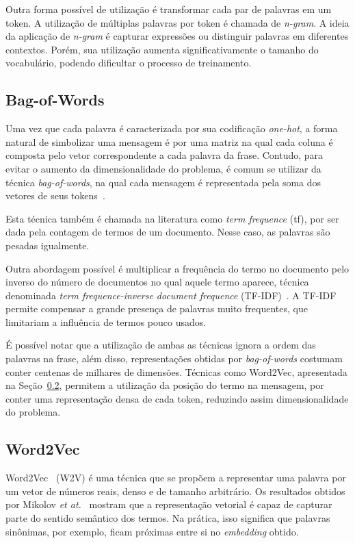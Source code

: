 Outra forma possível de utilização é transformar cada par de palavras em um token.
A utilização de múltiplas palavras por token é chamada de \textit{n-gram}.
A ideia da aplicação de \textit{n-gram} é capturar expressões ou distinguir palavras em diferentes contextos.
Porém, sua utilização aumenta significativamente o tamanho do vocabulário, podendo dificultar o processo de treinamento.

\subsection{Bag-of-Words}

Uma vez que cada palavra é caracterizada por sua codificação \textit{one-hot}, a forma natural de simbolizar uma
mensagem é por uma matriz na qual cada coluna é composta pelo vetor correspondente a cada palavra da frase.
Contudo, para evitar o aumento da dimensionalidade do problema, é comum se utilizar da técnica \textit{bag-of-words}, na
qual cada mensagem é representada pela soma dos vetores de seus tokens~\cite{schutze08}.

Esta técnica também é chamada na literatura como \textit{term frequence} (tf), por ser dada pela contagem de termos de
um documento.
Nesse caso, as palavras são pesadas igualmente.

Outra abordagem possível é multiplicar a frequência do termo no documento pelo inverso do número de documentos no qual
aquele termo aparece, técnica denominada \textit{term frequence-inverse document frequence} (TF-IDF)~\cite{salton88}.
A TF-IDF permite compensar a grande presença de palavras muito frequentes, que limitariam a influência de termos pouco
usados.

É possível notar que a utilização de ambas as técnicas ignora a ordem das palavras na frase, além disso, representações
obtidas por \textit{bag-of-words} costumam conter centenas de milhares de dimensões.
Técnicas como Word2Vec, apresentada na Seção~\ref{sec:w2v}, permitem a utilização da posição do termo na mensagem, por
conter uma representação densa de cada token, reduzindo assim dimensionalidade do problema.

\subsection{Word2Vec} \label{sec:w2v}

Word2Vec~\cite{mikolov13} (W2V) é uma técnica que se propõem a representar uma palavra por um vetor de números reais,
denso e de tamanho arbitrário.
Os resultados obtidos por Mikolov \textit{et at.}~\cite{mikolov13} mostram que a representação vetorial é capaz de
capturar parte do sentido semântico dos termos.
Na prática, isso significa que palavras sinônimas, por exemplo, ficam próximas entre si no \textit{embedding} obtido.

